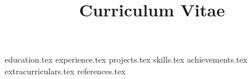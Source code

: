 \documentclass[11pt,a4paper,sans]{moderncv} %
\title{Curriculum Vitae}
\begin{document}
\makecvtitle

{education.tex}
{experience.tex}
{projects.tex}
{skills.tex}
{achievements.tex}
{extracurriculars.tex}
{references.tex}
\end{document}
